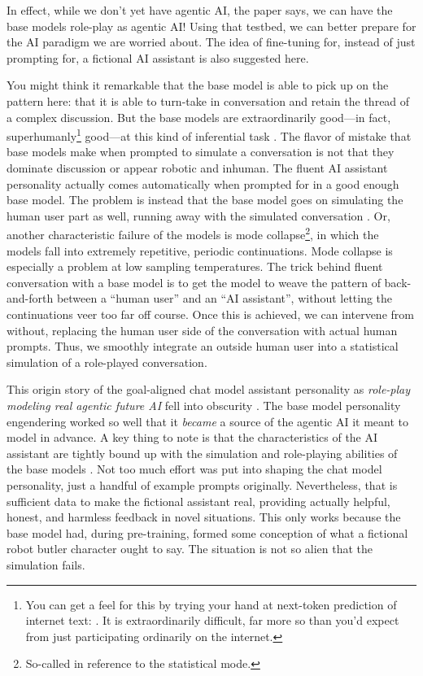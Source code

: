 In effect, while we don't yet have agentic AI, the paper says, we can have the
base models role-play as agentic AI! Using that testbed, we can better prepare
for the AI paradigm we are worried about. The idea of fine-tuning for, instead
of just prompting for, a fictional AI assistant is also suggested here.

You might think it remarkable that the base model is able to pick up on the
pattern here: that it is able to turn-take in conversation and retain the
thread of a complex discussion. But the base models are extraordinarily
good---in fact, superhumanly\footnote{You can get a feel for this by trying
your hand at next-token prediction of internet text:
. It is extraordinarily difficult, far
more so than you'd expect from just participating ordinarily on the internet.}
good---at this kind of inferential task \cite{shlegeris2024better}. The flavor
of mistake that base models make when prompted to simulate a conversation is
not that they dominate discussion or appear robotic and inhuman. The fluent AI
assistant personality actually comes automatically when prompted for in a good
enough base model. The problem is instead that the base model goes on
simulating the human user part as well, running away with the simulated
conversation \cite{edwards2024voice}. Or, another characteristic failure of the
models is mode collapse\footnote{So-called in reference to the statistical
mode.}, in which the models fall into extremely repetitive, periodic
continuations. Mode collapse is especially a problem at low sampling
temperatures. The trick behind fluent conversation with a base model is to get
the model to weave the pattern of back-and-forth between a ``human user'' and
an ``AI assistant'', without letting the continuations veer too far off course.
Once this is achieved, we can intervene from without, replacing the human user
side of the conversation with actual human prompts. Thus, we smoothly integrate
an outside human user into a statistical simulation of a role-played
conversation.

This origin story of the goal-aligned chat model assistant personality as
\emph{role-play modeling real agentic future AI} fell into obscurity
\cite{nostalgebraist2025void}. The base model personality engendering worked so
well that it \emph{became} a source of the agentic AI it meant to model in
advance. A key thing to note is that the characteristics of the AI assistant
are tightly bound up with the simulation and role-playing abilities of the base
models \cite{nostalgebraist2025void}. Not too much effort was put into shaping
the chat model personality, just a handful of example prompts originally.
Nevertheless, that is sufficient data to make the fictional assistant real,
providing actually helpful, honest, and harmless feedback in novel situations.
This only works because the base model had, during pre-training, formed some
conception of what a fictional robot butler character ought to say. The
situation is not so alien that the simulation fails.

